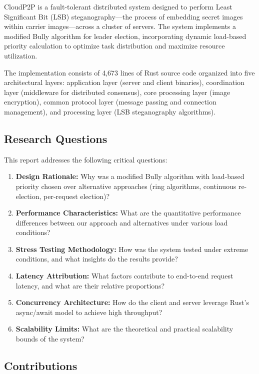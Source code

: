 \documentclass[12pt,a4paper]{article}
\begin{document}
CloudP2P is a fault-tolerant distributed system designed to perform Least Significant Bit (LSB) steganography---the process of embedding secret images within carrier images---across a cluster of servers. The system implements a modified Bully algorithm for leader election, incorporating dynamic load-based priority calculation to optimize task distribution and maximize resource utilization.

The implementation consists of 4,673 lines of Rust source code organized into five architectural layers: application layer (server and client binaries), coordination layer (middleware for distributed consensus), core processing layer (image encryption), common protocol layer (message passing and connection management), and processing layer (LSB steganography algorithms).

\subsection{Research Questions}

This report addresses the following critical questions:

\begin{enumerate}[leftmargin=*]
    \item \textbf{Design Rationale:} Why was a modified Bully algorithm with load-based priority chosen over alternative approaches (ring algorithms, continuous re-election, per-request election)?
    \item \textbf{Performance Characteristics:} What are the quantitative performance differences between our approach and alternatives under various load conditions?
    \item \textbf{Stress Testing Methodology:} How was the system tested under extreme conditions, and what insights do the results provide?
    \item \textbf{Latency Attribution:} What factors contribute to end-to-end request latency, and what are their relative proportions?
    \item \textbf{Concurrency Architecture:} How do the client and server leverage Rust's async/await model to achieve high throughput?
    \item \textbf{Scalability Limits:} What are the theoretical and practical scalability bounds of the system?
\end{enumerate}

\subsection{Contributions}
\end{document}
